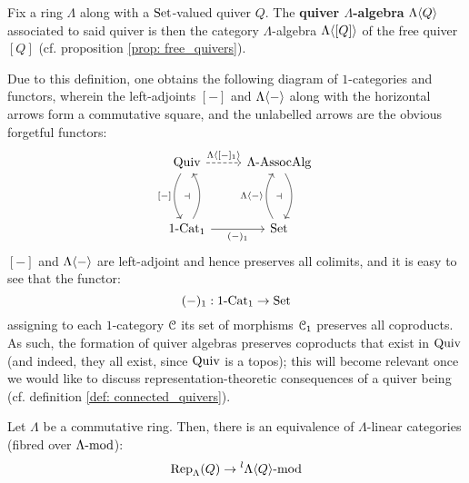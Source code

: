             \begin{example} \label{example: category_algebras_of_quivers}
                Fix a ring $\Lambda$ along with a $\Sets$-valued quiver $Q$. The \textbf{quiver $\Lambda$-algebra} $\Lambda\<Q\>$ associated to said quiver is then the category $\Lambda$-algebra $\Lambda\<[Q]\>$ of the free quiver $[Q]$ (cf. proposition \ref{prop: free_quivers}). 
                
                Due to this definition, one obtains the following diagram of $1$-categories and functors, wherein the left-adjoints $[-]$ and $\Lambda\<-\>$ along with the horizontal arrows form a commutative square, and the unlabelled arrows are the obvious forgetful functors:
                    $$
                        \begin{tikzcd}
                        	\Quiv & {\Lambda\-\Assoc\Alg} \\
                        	\\
                        	{1\-\Cat_1} & \Sets
                        	\arrow["{(-)_1}"', from=3-1, to=3-2]
                        	\arrow[""{name=0, anchor=center, inner sep=0}, bend right, from=3-1, to=1-1]
                        	\arrow[""{name=1, anchor=center, inner sep=0}, "{[-]}"', bend right, from=1-1, to=3-1]
                        	\arrow[""{name=2, anchor=center, inner sep=0}, "{\Lambda\<-\>}", bend left, from=3-2, to=1-2]
                        	\arrow[""{name=3, anchor=center, inner sep=0}, bend left, from=1-2, to=3-2]
                        	\arrow["{\Lambda\<[-]_1\>}", dashed, from=1-1, to=1-2]
                        	\arrow["\dashv"{anchor=center}, draw=none, from=1, to=0]
                        	\arrow["\dashv"{anchor=center}, draw=none, from=2, to=3]
                        \end{tikzcd}
                    $$
                $[-]$ and $\Lambda\<-\>$ are left-adjoint and hence preserves all colimits, and it is easy to see that the functor:
                    $$(-)_1: 1\-\Cat_1 \to \Sets$$
                assigning to each $1$-category $\C$ its set of morphisms $\C_1$ preserves all coproducts. As such, the formation of quiver algebras preserves coproducts that exist in $\Quiv$ (and indeed, they all exist, since $\Quiv$ is a topos); this will become relevant once we would like to discuss representation-theoretic consequences of a quiver being  (cf. definition \ref{def: connected_quivers}).
            \end{example}
            \begin{proposition} \label{prop: quiver_representations_are_modules_over_quiver_algebras}
                Let $\Lambda$ be a commutative ring. Then, there is an equivalence of $\Lambda$-linear categories (fibred over $\Lambda\mod$):
                    $$\Rep_{\Lambda}(Q) \to {}^l\Lambda\<Q\>\mod$$
            \end{proposition}
